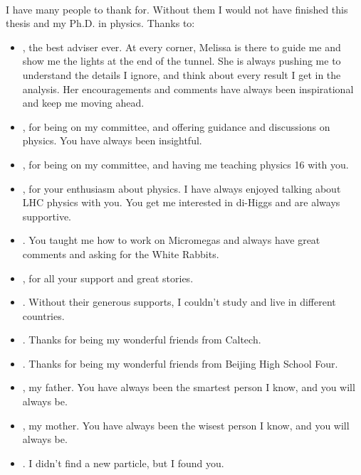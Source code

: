 
\paragraph{}
I have many people to thank for. Without them I would not have finished this thesis and my Ph.D. in physics. Thanks to:
\begin{itemize}
	\item {}, the best adviser ever. At every corner, Melissa is there to guide me and show me the lights at the end of the tunnel. She is always pushing me to understand the details I ignore, and think about every result I get in the analysis. Her encouragements and comments have always been inspirational and keep me moving ahead.
	\item {}, for being on my committee, and offering guidance and discussions on physics. You have always been insightful.
	\item {}, for being on my committee, and having me teaching physics 16 with you.
	\item {}, for your enthusiasm about physics. I have always enjoyed talking about LHC physics with you. You get me interested in di-Higgs and are always supportive.
	\item {}. You taught me how to work on Micromegas and always have great comments and asking for the White Rabbits.
	\item {}, for all your support and great stories.
	\item {}. Without their generous supports, I couldn't study and live in different countries.
	\item {}. Thanks for being my wonderful friends from Caltech.
	\item {}. Thanks for being my wonderful friends from Beijing High School Four.
	\item {}, my father. You have always been the smartest person I know, and you will always be.
	\item {}, my mother. You have always been the wisest person I know, and you will always be.
	\item {}. I didn't find a new particle, but I found you.
\end{itemize}

